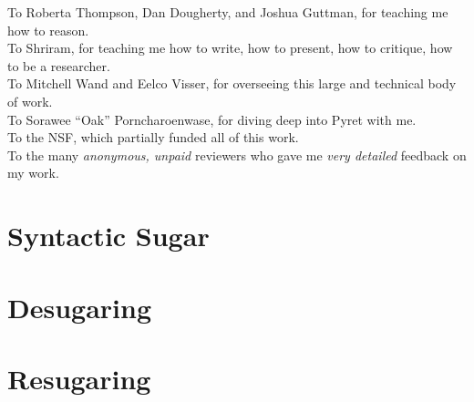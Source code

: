 \documentclass[
  10pt,
  paper=letter,
  footinclude=true,
  headinclude=true,
  american
]{scrbook}
\makeatletter
\renewcommand{\<}{\le}
\newcommand{\ArabicNumbering}{
  \clearscrheadfoot
  \pagenumbering{arabic}
  \lehead{\mbox{\llap{\small\pagemark\kern2em}\headmark\hfil}}
  \rohead{\mbox{\hfil{\headmark}\rlap{\small\kern2em\pagemark}}}
}
\newif\if@draft
\newif\ifl@fpage
\newif\ifl@tpage
\newif\ifl@epage
\newif\ift@cpage
\def\single@spacing{\def\baselinestretch{1}}
\def\final@spacing{\def\baselinestretch{1.3}}
\let\@disclaimer\@empty
\def\afterpreface{\cleardoublepage
  \ift@cpage
  \tableofcontents
  \ifx\@disclaimer\@empty
      \else
      \vspace{0.5cm}
      \single@spacing
      \noindent
      \hangindent\parindent
      \makebox[\parindent][l]{\raisebox{0.2ex}{\large{$\star$}} }\@disclaimer
      \if@draft\single@spacing\else\final@spacing\fi
    \fi
    \cleardoublepage\fi
  \ifl@fpage\addcontentsline{toc}{chapter}{List of Figures}\listoffigures
    \cleardoublepage\fi
  \ifl@epage\addcontentsline{toc}{chapter}{List of Examples}\listofexamples
    \cleardoublepage\fi}
\makeatother
\begin{document}
  \noindent To Roberta Thompson, Dan Dougherty, and Joshua Guttman,
  for teaching me how to reason.\\

  \noindent To Shriram, for teaching me how to write, how to present,
  how to critique, how to be a researcher.\\

  \noindent To Mitchell Wand and Eelco Visser, for overseeing this
  large and technical body of work.\\

  \noindent To Sorawee ``Oak'' Porncharoenwase, for diving deep into
  Pyret with me.\\

  \noindent To the NSF, which partially funded all of this work.\\

  \noindent To the many \emph{anonymous, unpaid} reviewers who gave me
  \emph{very detailed} feedback on my work.

\afterpreface

\ArabicNumbering


\part{Syntactic Sugar}

\part{Desugaring}


%
\part{Resugaring}



%
%



\end{document}
